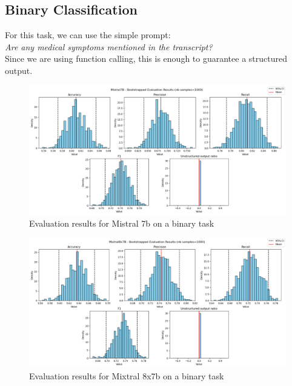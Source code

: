 \documentclass[11pt]{article}
\begin{document}
\subsection{Binary Classification}

For this task, we can use the simple prompt:\\

\textit{Are any medical symptoms mentioned in the transcript?}\\

Since we are using function calling, this is enough to guarantee a structured output.\\

\begin{figure}[h]
    \centering
    \includegraphics[width=\linewidth]{images//mistral//binary/mistral7b.png}
    \caption{Evaluation results for Mistral 7b on a binary task}
    \label{fig:enter-label}
\end{figure}

\begin{figure}[h]
    \centering
    \includegraphics[width=\linewidth]{images//mistral//binary/mistral8x7b.png}
    \caption{Evaluation results for Mixtral 8x7b on a binary task}
    \label{fig:enter-label}
\end{figure}
\end{document}
